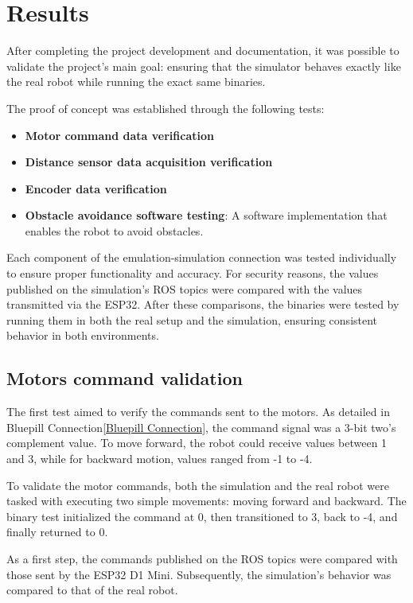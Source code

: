 \documentclass[../../monografia.tex]{subfiles}
\begin{document}
\section{Results}

After completing the project development and documentation, it was possible to validate the project's main goal: ensuring that the simulator behaves exactly like the real robot while running the exact same binaries.

The proof of concept was established through the following tests:

\begin{itemize}
    \item \textbf{Motor command data verification}
    \item \textbf{Distance sensor data acquisition verification}
    \item \textbf{Encoder data verification}
    \item \textbf{Obstacle avoidance software testing}: A software implementation that enables the robot to avoid obstacles.
\end{itemize}

Each component of the emulation-simulation connection was tested individually to ensure proper functionality and accuracy. For security reasons, the values published on the simulation's ROS topics were compared with the values transmitted via the ESP32. After these comparisons, the binaries were tested by running them in both the real setup and the simulation, ensuring consistent behavior in both environments.



\subsection{Motors command validation}

The first test aimed to verify the commands sent to the motors. As detailed in Bluepill Connection\ref{Bluepill Connection}, the command signal was a 3-bit two's complement value. To move forward, the robot could receive values between 1 and 3, while for backward motion, values ranged from -1 to -4.

To validate the motor commands, both the simulation and the real robot were tasked with executing two simple movements: moving forward and backward. The binary test initialized the command at 0, then transitioned to 3, back to -4, and finally returned to 0.

As a first step, the commands published on the ROS topics were compared with those sent by the ESP32 D1 Mini. Subsequently, the simulation's behavior was compared to that of the real robot.
\end{document}
